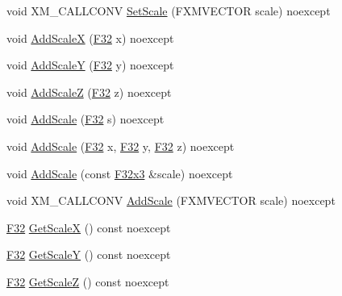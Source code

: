 \begin{DoxyCompactItemize}
\item 
void X\+M\+\_\+\+C\+A\+L\+L\+C\+O\+NV \mbox{\hyperlink{classmage_1_1_transform_a7dd2ca0ee43f956f1a6db79f83c14983}{Set\+Scale}} (F\+X\+M\+V\+E\+C\+T\+OR scale) noexcept
\item 
void \mbox{\hyperlink{classmage_1_1_transform_ae2f2f2109aca3c2c34ea1601d392e6a4}{Add\+ScaleX}} (\mbox{\hyperlink{namespacemage_aa97e833b45f06d60a0a9c4fc22ae02c0}{F32}} x) noexcept
\item 
void \mbox{\hyperlink{classmage_1_1_transform_a6f3dbff67c49f2d920c25d46cf25d0ee}{Add\+ScaleY}} (\mbox{\hyperlink{namespacemage_aa97e833b45f06d60a0a9c4fc22ae02c0}{F32}} y) noexcept
\item 
void \mbox{\hyperlink{classmage_1_1_transform_ae9aa81d2f6af6422a261878b63a0e5de}{Add\+ScaleZ}} (\mbox{\hyperlink{namespacemage_aa97e833b45f06d60a0a9c4fc22ae02c0}{F32}} z) noexcept
\item 
void \mbox{\hyperlink{classmage_1_1_transform_a3b90baf1db39dd3dc17a9203b4383073}{Add\+Scale}} (\mbox{\hyperlink{namespacemage_aa97e833b45f06d60a0a9c4fc22ae02c0}{F32}} s) noexcept
\item 
void \mbox{\hyperlink{classmage_1_1_transform_a9159be1589e53e93d50cf3dad60e7f75}{Add\+Scale}} (\mbox{\hyperlink{namespacemage_aa97e833b45f06d60a0a9c4fc22ae02c0}{F32}} x, \mbox{\hyperlink{namespacemage_aa97e833b45f06d60a0a9c4fc22ae02c0}{F32}} y, \mbox{\hyperlink{namespacemage_aa97e833b45f06d60a0a9c4fc22ae02c0}{F32}} z) noexcept
\item 
void \mbox{\hyperlink{classmage_1_1_transform_aa5c1edbdcec945f4587c6075f2101b5c}{Add\+Scale}} (const \mbox{\hyperlink{namespacemage_a1e3c7a882af461f161caa1cbddaf1fa2}{F32x3}} \&scale) noexcept
\item 
void X\+M\+\_\+\+C\+A\+L\+L\+C\+O\+NV \mbox{\hyperlink{classmage_1_1_transform_a2e424087adc2332bb254dc6162202866}{Add\+Scale}} (F\+X\+M\+V\+E\+C\+T\+OR scale) noexcept
\item 
\mbox{\hyperlink{namespacemage_aa97e833b45f06d60a0a9c4fc22ae02c0}{F32}} \mbox{\hyperlink{classmage_1_1_transform_a86eff370d6cb37a7aa5f7d78d4cf3cf4}{Get\+ScaleX}} () const noexcept
\item 
\mbox{\hyperlink{namespacemage_aa97e833b45f06d60a0a9c4fc22ae02c0}{F32}} \mbox{\hyperlink{classmage_1_1_transform_a17bd579657e31fbdc1eacec0836140c5}{Get\+ScaleY}} () const noexcept
\item 
\mbox{\hyperlink{namespacemage_aa97e833b45f06d60a0a9c4fc22ae02c0}{F32}} \mbox{\hyperlink{classmage_1_1_transform_aa7ba1aa16161ec656b2828c2433f6dbd}{Get\+ScaleZ}} () const noexcept

\end{DoxyCompactItemize}
